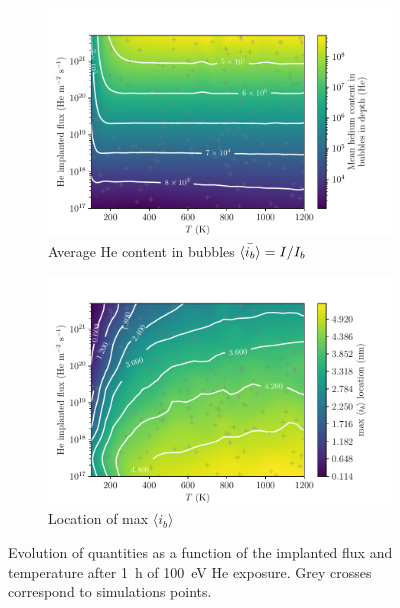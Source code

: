 \begin{figure} [ht!]
    \begin{subfigure}{0.5\linewidth}
        \centering
        \includegraphics[width=\linewidth]{Figures/Chapter4/parametric study/mean_ib_T_phi.pdf}
        \caption{Average He content in bubbles $\Bar{\langle i_b \rangle} = I / I_b$}
        \label{fig: mean ib T phi}
    \end{subfigure}%
    \begin{subfigure}{0.5\linewidth}
        \centering
        \includegraphics[width=\linewidth]{Figures/Chapter4/parametric study/x_max_ib_T_phi.pdf}
        \caption{Location of max $\langle i_b \rangle$}
        \label{fig: x max ib T phi}
    \end{subfigure}
    \caption{Evolution of quantities as a function of the implanted flux and temperature after \SI{1}{h} of \SI{100}{eV} He exposure. Grey crosses correspond to simulations points.}
    \label{fig:T phi quantities}
\end{figure}

